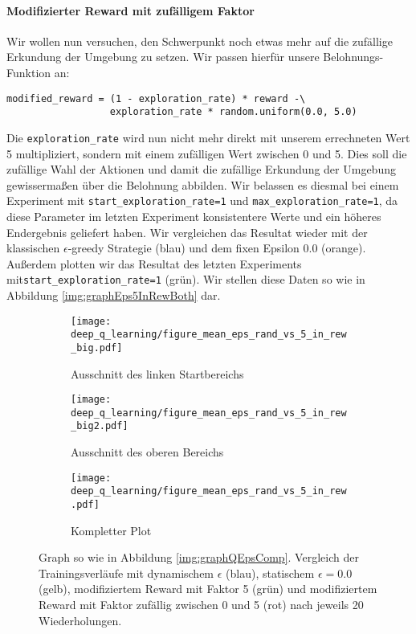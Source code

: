 \paragraph{Modifizierter Reward mit zufälligem Faktor}
Wir wollen nun versuchen, den Schwerpunkt noch etwas mehr auf die zufällige Erkundung der Umgebung zu setzen. Wir passen hierfür unsere Belohnungs-Funktion an:
\begin{verbatim}
modified_reward = (1 - exploration_rate) * reward -\
                  exploration_rate * random.uniform(0.0, 5.0)
\end{verbatim}
Die \texttt{exploration_rate} wird nun nicht mehr direkt mit unserem errechneten Wert 5 multipliziert, sondern mit einem zufälligen Wert zwischen 0 und 5. Dies soll die zufällige Wahl der Aktionen und damit die zufällige Erkundung der Umgebung gewissermaßen über die Belohnung abbilden. Wir belassen es diesmal bei einem Experiment mit \texttt{start_exploration_rate=1} und \texttt{max_exploration_rate=1}, da diese Parameter im letzten Experiment konsistentere Werte und ein höheres Endergebnis geliefert haben. Wir vergleichen das Resultat wieder mit der klassischen $ \epsilon $-greedy Strategie (blau) und dem fixen Epsilon 0.0 (orange). Außerdem plotten wir das Resultat des letzten Experiments mit\linebreak\texttt{start_exploration_rate=1} (grün). Wir stellen diese Daten so wie in Abbildung \ref{img:graphEps5InRewBoth} dar.

\begin{figure}[h!]
    \centering
    \begin{subfigure}[b]{0.49\textwidth}
        \texttt{[image: deep\_q\_learning/figure\_mean\_eps\_rand\_vs\_5\_in\_rew\_big.pdf]}
        \caption{Ausschnitt des linken Startbereichs}
        \label{img:graphEpsRandVs5InRewBig}
    \end{subfigure}
    \begin{subfigure}[b]{0.49\textwidth}
        \texttt{[image: deep\_q\_learning/figure\_mean\_eps\_rand\_vs\_5\_in\_rew\_big2.pdf]}
        \caption{Ausschnitt des oberen Bereichs}
        \label{img:graphEpsRandVs5InRewBig2}
    \end{subfigure}
    \begin{subfigure}[b]{0.7\textwidth}
        \texttt{[image: deep\_q\_learning/figure\_mean\_eps\_rand\_vs\_5\_in\_rew.pdf]}
        \caption{Kompletter Plot}
        \label{img:graphEpsRandVs5InRew}
    \end{subfigure}
    \caption{Graph so wie in Abbildung \ref{img:graphQEpsComp}. Vergleich der Trainingsverläufe mit dynamischem $ \epsilon $ (blau), statischem $ \epsilon = 0.0 $ (gelb), modifiziertem Reward mit Faktor 5 (grün) und modifiziertem Reward mit Faktor zufällig zwischen 0 und 5 (rot) nach jeweils 20 Wiederholungen.}
    \label{img:graphEpsRandVs5InRewBoth}
\end{figure}

